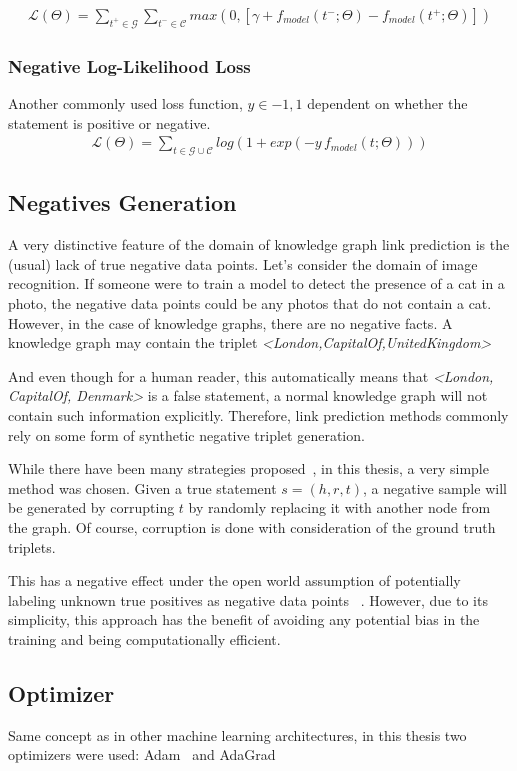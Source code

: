 \begin{gather*}
    \mathcal{L}(\Theta) = \sum_{t^+ \in \mathcal{G}}\sum_{t^- \in \mathcal{C}}max(0, [\gamma + f_{model}(t^-;\Theta)
 - f_{model}(t^+;\Theta)])
\end{gather*}

\subsubsection{Negative Log-Likelihood Loss}
Another commonly used loss function, $y \in -1,1 $ dependent on whether the statement is positive or negative.
\begin{gather*}
    \mathcal{L}(\Theta) = \sum_{t \in \mathcal{G} \cup \mathcal{C}}log(1 + exp(-y \, f_{model}(t;\Theta)))
\end{gather*}

\subsection{Negatives Generation}\label{subsec:negatives-generation}
A very distinctive feature of the domain of knowledge graph link prediction is the (usual) lack of true negative data points.
Let's consider the domain of image recognition.
If someone were to train a model to detect the presence of a cat in a photo,
the negative data points could be any photos that do not contain a cat.
However, in the case of knowledge graphs, there are no negative facts.
A knowledge graph may contain the triplet \textit{<London,CapitalOf,UnitedKingdom>}

And even though for a human reader, this automatically means that \textit{<London, CapitalOf, Denmark>} is a false statement,
a normal knowledge graph will not contain such information explicitly.
Therefore, link prediction methods commonly rely on some form of synthetic negative triplet generation.

While there have been many strategies proposed~\cite{NegSamp}, in this thesis, a very simple method was chosen.
Given a true statement $s = (h,r,t)$, a negative sample will be generated by corrupting $t$ by randomly replacing it with another node from the graph.
Of course, corruption is done with consideration of the ground truth triplets.

This has a negative effect under the open world assumption
of potentially labeling unknown true positives as negative data points ~\cite{OpenWorld}.
However, due to its simplicity, this approach has the benefit of avoiding any potential bias in the training
and being computationally efficient.

\subsection{Optimizer}
Same concept as in other machine learning architectures, in this thesis two optimizers were used:
Adam~\cite{Adam} and AdaGrad~\cite{Adagrad}

